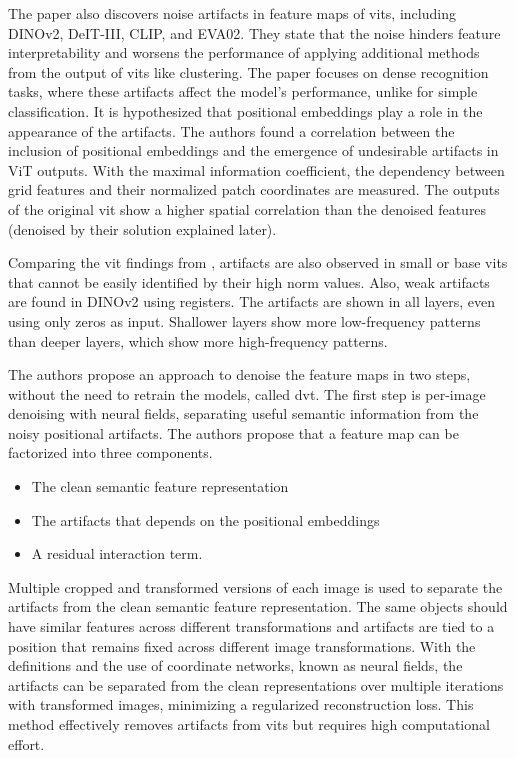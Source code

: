 \documentclass[conference]{IEEEtran}
\begin{document}
  The paper also discovers noise artifacts in feature maps of \acp{vit}, including \mbox{DINOv2}, DeIT-III, CLIP, and EVA02. They state that the noise hinders feature interpretability and worsens the performance of applying additional methods from the output of \acp{vit} like clustering. The paper focuses on dense recognition tasks, where these artifacts affect the model's performance, unlike for simple classification. It is hypothesized that positional embeddings play a role in the appearance of the artifacts. The authors found a correlation between the inclusion of positional embeddings and the emergence of undesirable artifacts in ViT outputs. With the maximal information coefficient, the dependency between grid features and their normalized patch coordinates are measured. The outputs of the original \ac{vit} show a higher spatial correlation than the denoised features (denoised by their solution explained later).

  Comparing the \ac{vit} findings from \cite{registers}, artifacts are also observed in small or base \acp{vit} that cannot be easily identified by their high norm values. Also, weak artifacts are found in \mbox{DINOv2} using registers. The artifacts are shown in all layers, even using only zeros as input. Shallower layers show more low-frequency patterns than deeper layers, which show more high-frequency patterns.
 
  The authors propose an approach to denoise the feature maps in two steps, without the need to retrain the models, called \acf{dvt}. The first step is per-image denoising with neural fields, separating useful semantic information from the noisy positional artifacts. The authors propose that a feature map can be factorized into three components.
  \begin{itemize}
    \item The clean semantic feature representation
    \item The artifacts that depends on the positional embeddings
    \item A residual interaction term.
  \end{itemize}

  Multiple cropped and transformed versions of each image is used to separate the artifacts from the clean semantic feature representation. The same objects should have similar features across different transformations and artifacts are tied to a position that remains fixed across different image transformations. With the definitions and the use of coordinate networks, known as neural fields, the artifacts can be separated from the clean representations over multiple iterations with transformed images, minimizing a regularized reconstruction loss. This method effectively removes artifacts from \acp{vit} but requires high computational effort.
\end{document}
